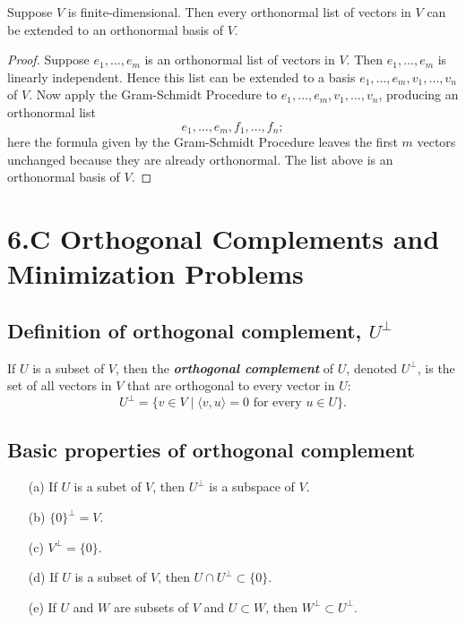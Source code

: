 \documentclass[11pt]{article}
\begin{document}
    Suppose $V$ is finite-dimensional. Then every orthonormal list of vectors in $V$ can be extended to an orthonormal basis of $V$.

    \begin{proof}
        Suppose \(e_1, \dots, e_m\) is an orthonormal list of vectors in $V$. Then \(e_1, \dots, e_m\) is linearly independent. Hence this list can be extended to a basis \(e_1, \dots, e_m, v_1, \dots, v_n\) of $V$. Now apply the Gram-Schmidt Procedure to \(e_1, \dots, e_m, v_1, \dots, v_n\), producing an orthonormal list \[e_1, \dots, e_m, f_1, \dots, f_n;\] here the formula given by the Gram-Schmidt Procedure leaves the first $m$ vectors unchanged because they are already orthonormal. The list above is an orthonormal basis of $V$. 
    \end{proof}

    \section{6.C Orthogonal Complements and Minimization Problems}

    \subsection{Definition of orthogonal complement, \(U^{\perp}\)}

    If $U$ is a subset of $V$, then the \textbf{\emph{orthogonal complement}} of $U$, denoted \(U^{\perp}\), is the set of all vectors in $V$ that are orthogonal to every vector in $U$: \[U^{\perp} = \{ v \in V \mid \langle v,u \rangle = 0 \text{ for every } u \in U\}.\]

    \subsection{Basic properties of orthogonal complement}

    \begin{enumerate}
        \item[(a)] If $U$ is a subet of $V$, then \(U^{\perp}\) is a subspace of $V$.
        \item[(b)] \(\{0\}^{\perp} = V.\)
        \item[(c)] \(V^{\perp} = \{0\}.\)
        \item[(d)] If $U$ is a subset of $V$, then \(U \cap U^{\perp} \subset \{0\}.\)
        \item[(e)] If $U$ and $W$ are subsets of $V$ and \(U \subset W\), then \(W^{\perp} \subset U^{\perp}.\) 
    \end{enumerate}
\end{document}
